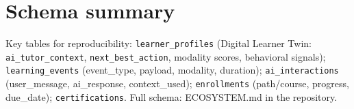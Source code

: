 \documentclass[10pt,twocolumn]{article}
\begin{document}
\appendix
\section{Schema summary}
Key tables for reproducibility: \texttt{learner\_profiles} (Digital Learner Twin: \texttt{ai\_tutor\_context}, \texttt{next\_best\_action}, modality scores, behavioral signals); \texttt{learning\_events} (event\_type, payload, modality, duration); \texttt{ai\_interactions} (user\_message, ai\_response, context\_used); \texttt{enrollments} (path/course, progress, due\_date); \texttt{certifications}. Full schema: ECOSYSTEM.md in the repository.



\end{document}
